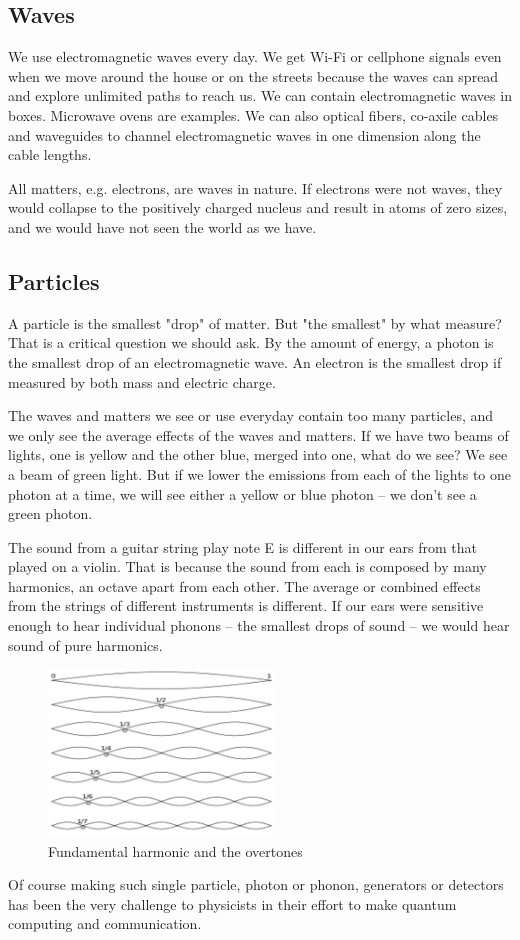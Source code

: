 \documentclass{book}
\begin{document}
\subsection{Waves}
We use electromagnetic waves every day. We get Wi-Fi or cellphone signals even when we move around the house or on the streets because the waves can spread and explore unlimited paths to reach us. We can contain electromagnetic waves in boxes. Microwave ovens are examples. We can also optical fibers, co-axile cables and waveguides to channel electromagnetic waves in one dimension along the cable lengths.

All matters, e.g. electrons, are waves in nature. If electrons were not waves, they would collapse to the positively charged nucleus and result in atoms of zero sizes, and we would have not seen the world as we have.

\subsection{Particles}
A particle is the smallest "drop" of matter. But "the smallest" by what measure? That is a critical question we should ask. By the amount of energy, a photon is the smallest drop of an electromagnetic wave. An electron is the smallest drop if measured by both mass and electric charge.

The waves and matters we see or use everyday contain too many particles, and we only see the average effects of the waves and matters. If we have two beams of lights, one is yellow and the other blue, merged into one, what do we see? We see a beam of green light. But if we lower the emissions from each of the lights to one photon at a time, we will see either a yellow or blue photon -- we don't see a green photon. 

The sound from a guitar string play note E is different in our ears from that played on a violin. That is because the sound from each is composed by many harmonics, an octave apart from each other. The average or combined effects from the strings of different instruments is different. If our ears were sensitive enough to hear individual phonons -- the smallest drops of sound -- we would hear sound of pure harmonics.
\begin{figure}[ht]
\includegraphics[width=6cm]{overtones.png}
\caption{Fundamental harmonic and the overtones}
\label{Overtones}
\end{figure}
Of course making such single particle, photon or phonon, generators or detectors has been the very challenge to physicists in their effort to make quantum computing and communication.
\end{document}
